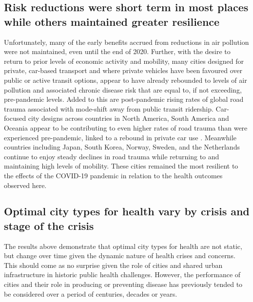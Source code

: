 \documentclass[preprint,10pt]{elsarticle} %
\begin{document}
\subsection*{Risk reductions were short term in most places while others maintained greater resilience}
Unfortunately, many of the early benefits accrued from reductions in air pollution were not maintained, even until the end of 2020. Further, with the desire to return to prior levels of economic activity and mobility, many cities designed for private, car-based transport and where private vehicles have been favoured over public or active transit options\cite{DAS20211}, appear to have already rebounded to levels of air pollution and associated chronic disease risk that are equal to, if not exceeding, pre-pandemic levels. Added to this are post-pandemic rising rates of global road trauma associated with mode-shift away from public transit ridership. Car-focused city designs across countries in North America, South America and Oceania appear to be contributing to even higher rates of road trauma than were experienced pre-pandemic, linked to a rebound in private car use \cite{ITFRS}. Meanwhile countries including Japan, South Korea, Norway, Sweden, and the Netherlands continue to enjoy steady declines in road trauma while returning to and maintaining high levels of mobility. These cities remained the most resilient to the effects of the COVID-19 pandemic in relation to the health outcomes observed here.


\subsection*{Optimal city types for health vary by crisis and stage of the crisis}

The results above demonstrate that optimal city types for health are not static, but change over time given the dynamic nature of health crises and concerns. This should come as no surprise given the role of cities and shared urban infrastructure in historic public health challenges. However, the performance of cities and their role in producing or preventing disease has previously tended to be considered over a period of centuries, decades or years. 
\end{document}
